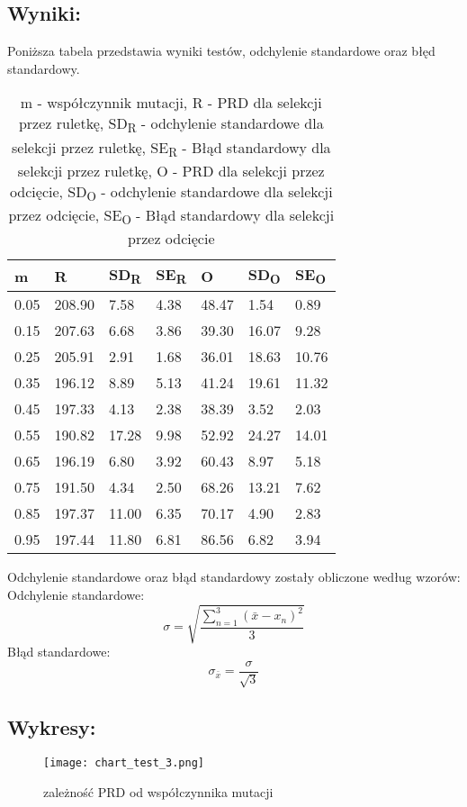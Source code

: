   \subsection{Wyniki: }
  Poniższa tabela przedstawia wyniki testów, odchylenie standardowe oraz błęd standardowy.
  \begin{table}[!ht]
    \centering
    \begin{tabular}{|l|l|l|l|l|l|l|}
    \hline
        m & R & SD\textsubscript{R} & SE\textsubscript{R} & O & SD\textsubscript{O} & SE\textsubscript{O} \\ \hline
        0.05 & 208.90 & 7.58 & 4.38 & 48.47 & 1.54 & 0.89 \\ \hline
        0.15 & 207.63 & 6.68 & 3.86 & 39.30 & 16.07 & 9.28 \\ \hline
        0.25 & 205.91 & 2.91 & 1.68 & 36.01 & 18.63 & 10.76 \\ \hline
        0.35 & 196.12 & 8.89 & 5.13 & 41.24 & 19.61 & 11.32 \\ \hline
        0.45 & 197.33 & 4.13 & 2.38 & 38.39 & 3.52 & 2.03 \\ \hline
        0.55 & 190.82 & 17.28 & 9.98 & 52.92 & 24.27 & 14.01 \\ \hline
        0.65 & 196.19 & 6.80 & 3.92 & 60.43 & 8.97 & 5.18 \\ \hline
        0.75 & 191.50 & 4.34 & 2.50 & 68.26 & 13.21 & 7.62 \\ \hline
        0.85 & 197.37 & 11.00 & 6.35 & 70.17 & 4.90 & 2.83 \\ \hline
        0.95 & 197.44 & 11.80 & 6.81 & 86.56 & 6.82 & 3.94 \\ \hline
    \end{tabular}
    \caption{m - współczynnik mutacji, R - PRD dla selekcji przez ruletkę, SD\textsubscript{R} - odchylenie standardowe dla selekcji przez ruletkę, SE\textsubscript{R} - Błąd standardowy dla selekcji przez ruletkę, O - PRD dla selekcji przez odcięcie, SD\textsubscript{O} - odchylenie standardowe dla selekcji przez odcięcie, SE\textsubscript{O} - Błąd standardowy dla selekcji przez odcięcie}

  \end{table}
    Odchylenie standardowe oraz błąd standardowy zostały obliczone według wzorów: \\
    Odchylenie standardowe:
    \[ \sigma = \sqrt{\frac{\sum_{n = 1}^{3}(\bar{x} - x_n)^2}{3}} \]
    Błąd standardowe:
    \[ \sigma_{\bar{x}} = \frac{\sigma}{\sqrt{3}} \]

  \subsection{Wykresy: }
    \begin{figure}[H]
      \texttt{[image: chart\_test\_3.png]}
      \centering
      \caption{zależność PRD od współczynnika mutacji}
    \end{figure}
  
